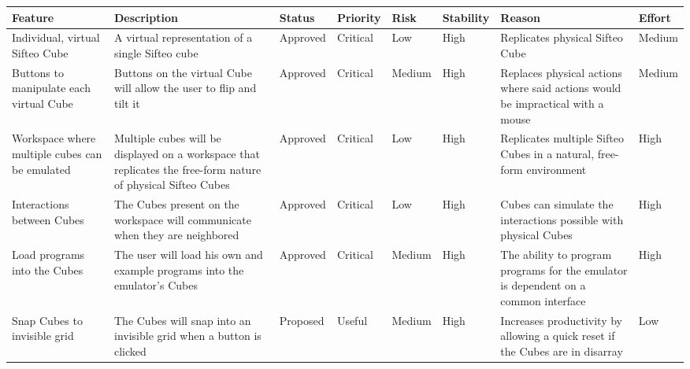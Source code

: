 \documentclass[12pt]{article}
\begin{document}
    \begin{landscape}
    \begin{table}[h]
      \begin{tabular}{p{1.5in} | p{1.75in} | p{.75in} | p{.75in} | p{.75in} | p{.75in} | p{1.75in} | p{.6in}}
        \textbf{Feature} &
        \textbf{Description} &
        \textbf{Status} &
        \textbf{Priority} &
        \textbf{Risk} &
        \textbf{Stability} &
        \textbf{Reason} &
        \textbf{Effort} \\ \hline

        Individual, virtual Sifteo Cube &
        A virtual representation of a single Sifteo cube &
        Approved &
        Critical &
        Low &
        High &
        Replicates physical Sifteo Cube &
        Medium \\ \hline

        Buttons to manipulate each virtual Cube &
        Buttons on the virtual Cube will allow the user to flip and tilt it &
        Approved &
        Critical &
        Medium &
        High &
        Replaces physical actions where said actions would be impractical with a mouse &
        Medium \\ \hline

        Workspace where multiple cubes can be emulated &
        Multiple cubes will be displayed on a workspace that replicates the free-form nature of physical Sifteo Cubes\index{Sifteo Cubes} &
        Approved &
        Critical &
        Low &
        High &
        Replicates multiple Sifteo Cubes\index{Sifteo Cubes} in a natural, free-form environment &
        High \\ \hline

        Interactions between Cubes &
        The Cubes present on the workspace will communicate when they are neighbored &
        Approved &
        Critical &
        Low &
        High &
        Cubes can simulate the interactions possible with physical Cubes &
        High \\ \hline

        Load programs into the Cubes &
        The user will load his own and example programs into the emulator’s\index{emulator} Cubes &
        Approved &
        Critical &
        Medium &
        High &
        The ability to program programs for the emulator\index{emulator} is dependent on a common interface &
        High \\ \hline

        Snap Cubes to invisible grid &
        The Cubes will snap into an invisible grid when a button is clicked &
        Proposed &
        Useful &
        Medium &
        High &
        Increases productivity by allowing a quick reset if the Cubes are in disarray &
        Low \\ \hline


\end{tabular}
\end{table}
\end{landscape}
\end{document}
